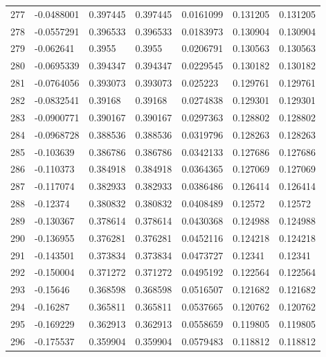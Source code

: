 \begin{longtable}{l|lll|lll}
 277 & -0.0488001   & 0.397445    & 0.397445    &  0.0161099   & 0.131205    & 0.131205    \\
 278 & -0.0557291   & 0.396533    & 0.396533    &  0.0183973   & 0.130904    & 0.130904    \\
 279 & -0.062641    & 0.3955      & 0.3955      &  0.0206791   & 0.130563    & 0.130563    \\
 280 & -0.0695339   & 0.394347    & 0.394347    &  0.0229545   & 0.130182    & 0.130182    \\
 281 & -0.0764056   & 0.393073    & 0.393073    &  0.025223    & 0.129761    & 0.129761    \\
 282 & -0.0832541   & 0.39168     & 0.39168     &  0.0274838   & 0.129301    & 0.129301    \\
 283 & -0.0900771   & 0.390167    & 0.390167    &  0.0297363   & 0.128802    & 0.128802    \\
 284 & -0.0968728   & 0.388536    & 0.388536    &  0.0319796   & 0.128263    & 0.128263    \\
 285 & -0.103639    & 0.386786    & 0.386786    &  0.0342133   & 0.127686    & 0.127686    \\
 286 & -0.110373    & 0.384918    & 0.384918    &  0.0364365   & 0.127069    & 0.127069    \\
 287 & -0.117074    & 0.382933    & 0.382933    &  0.0386486   & 0.126414    & 0.126414    \\
 288 & -0.12374     & 0.380832    & 0.380832    &  0.0408489   & 0.12572     & 0.12572     \\
 289 & -0.130367    & 0.378614    & 0.378614    &  0.0430368   & 0.124988    & 0.124988    \\
 290 & -0.136955    & 0.376281    & 0.376281    &  0.0452116   & 0.124218    & 0.124218    \\
 291 & -0.143501    & 0.373834    & 0.373834    &  0.0473727   & 0.12341     & 0.12341     \\
 292 & -0.150004    & 0.371272    & 0.371272    &  0.0495192   & 0.122564    & 0.122564    \\
 293 & -0.15646     & 0.368598    & 0.368598    &  0.0516507   & 0.121682    & 0.121682    \\
 294 & -0.16287     & 0.365811    & 0.365811    &  0.0537665   & 0.120762    & 0.120762    \\
 295 & -0.169229    & 0.362913    & 0.362913    &  0.0558659   & 0.119805    & 0.119805    \\
 296 & -0.175537    & 0.359904    & 0.359904    &  0.0579483   & 0.118812    & 0.118812    \\

\end{longtable}
